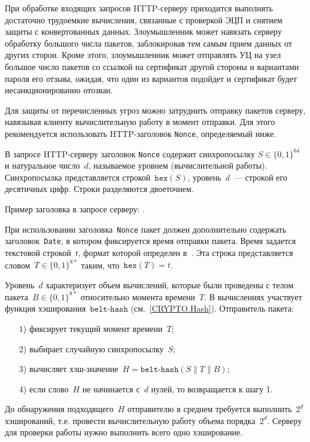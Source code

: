 При обработке входящих запросов HTTP-серверу приходится выполнять 
достаточно трудоемкие вычисления, связанные с проверкой ЭЦП и снятием 
защиты с конвертованных данных.
%
Злоумышленник может навязать серверу обработку большого числа пакетов, 
заблокировав тем самым прием данных от других сторон. 
%
Кроме этого, злоумышленник может отправлять УЦ на узел~
большое число пакетов со ссылкой на сертификат другой стороны и вариантами 
пароля его отзыва, ожидая, что один из вариантов подойдет и сертификат 
будет несанкционированно отозван.

Для защиты от перечисленных угроз можно затруднить отправку пакетов 
серверу, навязывая клиенту вычислительную работу в момент отправки.
Для этого рекомендуется использовать HTTP-заголовок \texttt{Nonce}, 
определяемый ниже.

В запросе HTTP-серверу заголовок \texttt{Nonce} содержит синхропосылку 
$S\in\{0,1\}^{64}$ и натуральное число~$d$, называемое уровнем 
(вычислительной работы).
%
Синхропосылка представляется строкой~$\texttt{hex}(S)$, уровень~$d$~--- 
строкой его десятичных цифр. Строки разделяются двоеточием.

Пример заголовка в запросе серверу: .

При использовании заголовка~\texttt{Nonce} пакет должен дополнительно
содержать заголовок~\texttt{Date}, в котором фиксируется время отправки 
пакета. Время задается текстовой строкой~$t$, формат которой определен 
в~\cite{HTTP}. Эта строка представляется словом~$T\in\{0,1\}^{8*}$ таким, 
что~$\texttt{hex}(T)=t$.

Уровень~$d$ характеризует объем вычислений, которые были проведены
с телом пакета~$B\in\{0,1\}^{8*}$ относительно момента времени~$T$.
%
В вычислениях участвует функция хэширования~$\texttt{belt-hash}$
(см.~\ref{CRYPTO.Hash}). Отправитель пакета:
\begin{enumerate}
\item[1)]
фиксирует текущий момент времени~$T$;
\item[2)]
выбирает случайную синхропосылку~$S$;
\item[3)]
вычисляет хэш-значение~$H=\texttt{belt-hash}(S\parallel T\parallel B)$;
\item[4)]
если слово~$H$ не начинается с~$d$ нулей, то возвращается к шагу 1.
\end{enumerate}

До обнаружения подходящего~$H$ отправителю в среднем требуется 
выполнить~$2^d$ хэширований, т.е. провести вычислительную работу объема  
порядка~$2^d$. Серверу для проверки работы нужно выполнить всего одно
хэширование.

